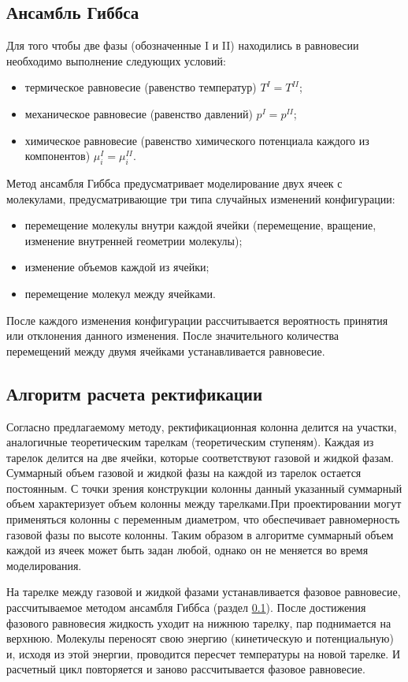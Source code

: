\subsection{Ансамбль Гиббса} \label{p.gibbs}
Для того чтобы две фазы (обозначенные I и II) находились в равновесии необходимо выполнение следующих условий:
\begin{itemize}
	\item термическое равновесие (равенство температур) $T^I = T^{II}$;
	\item механическое равновесие (равенство давлений) $p^I = p^{II}$;
	\item химическое равновесие (равенство химического потенциала каждого из компонентов) $\mu_i^I = \mu_i^{II}$.
\end{itemize}

Метод ансамбля Гиббса предусматривает моделирование двух ячеек с молекулами, предусматривающие три типа случайных изменений конфигурации:
\begin{itemize}
	\item перемещение молекулы внутри каждой ячейки (перемещение, вращение, изменение внутренней геометрии молекулы);
	\item изменение объемов каждой из ячейки;
	\item перемещение молекул между ячейками.
\end{itemize}
После каждого изменения конфигурации рассчитывается вероятность принятия или отклонения данного изменения. После значительного количества перемещений между двумя ячейками устанавливается равновесие.


\subsection{Алгоритм расчета ректификации}
Согласно предлагаемому методу, ректификационная колонна делится на участки, аналогичные теоретическим тарелкам (теоретическим ступеням). Каждая из тарелок делится на две ячейки, которые соответствуют газовой и жидкой фазам. Суммарный объем газовой и жидкой фазы на каждой из тарелок остается постоянным. С точки зрения конструкции колонны данный указанный суммарный объем характеризует объем колонны между тарелками.При проектировании могут применяться колонны с переменным диаметром, что обеспечивает равномерность газовой фазы по высоте колонны. Таким образом в алгоритме суммарный объем каждой из ячеек может быть задан любой, однако он не меняется во время моделирования.

На тарелке между газовой и жидкой фазами устанавливается фазовое равновесие, рассчитываемое методом ансамбля Гиббса (раздел \ref{p.gibbs}). После достижения фазового равновесия жидкость уходит на нижнюю тарелку, пар поднимается на верхнюю. Молекулы переносят свою энергию (кинетическую и потенциальную) и, исходя из этой энергии, проводится пересчет температуры на новой тарелке. И расчетный цикл повторяется и заново рассчитывается фазовое равновесие. 

